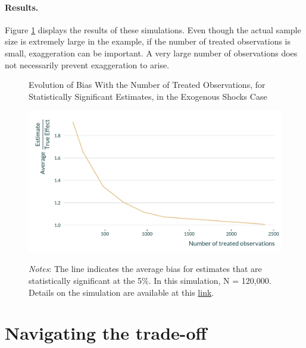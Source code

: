 \documentclass[usletter, 12pt]{article}
\begin{document}
			\paragraph{Results.} Figure \ref{graph_shocks} displays the results of these simulations. Even though the actual sample size is extremely large in the example, if the number of treated observations is small, exaggeration can be important. A very large number of observations does not necessarily prevent exaggeration to arise.  

			\begin{figure}[!h] 
                    			\begin{center}
                    				\caption{Evolution of Bias With the Number of Treated Observations, for Statistically Significant Estimates, in the Exogenous Shocks Case}
                    				\label{graph_shocks}
                    				\includegraphics[width=0.8\linewidth]{images/main_graph_DID_paper.pdf}
                                    \caption*{\footnotesize \textit{Notes}: The line indicates the average bias for estimates that are statistically significant at the 5\%. In this simulation, N = 120,000. Details on the simulation are available at this \href{https://vincentbagilet.github.io/causal_inflation/DID.html}{link}.}
                                    \end{center}
				\vspace{-1cm}
                    		\end{figure} 
		
		



	\section{Navigating the trade-off} \label{discussion}
\end{document}
